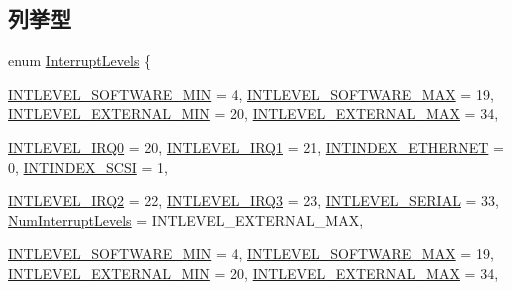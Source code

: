 \subsection*{列挙型}
\begin{DoxyCompactItemize}
\item 
enum \hyperlink{namespaceMipsISA_aa201d1f9b8ac67b80bdf6c08f370558c}{InterruptLevels} \{ \par
\hyperlink{namespaceMipsISA_aa201d1f9b8ac67b80bdf6c08f370558ca8db7857d98d7e42b3e02bed7c3c540ba}{INTLEVEL\_\-SOFTWARE\_\-MIN} =  4, 
\hyperlink{namespaceMipsISA_aa201d1f9b8ac67b80bdf6c08f370558ca9918551eda4baa1f4e11aaf334bb894b}{INTLEVEL\_\-SOFTWARE\_\-MAX} =  19, 
\hyperlink{namespaceMipsISA_aa201d1f9b8ac67b80bdf6c08f370558cafc78264c66a1ac704f17daa5fa9f9260}{INTLEVEL\_\-EXTERNAL\_\-MIN} =  20, 
\hyperlink{namespaceMipsISA_aa201d1f9b8ac67b80bdf6c08f370558cae599256ab529cbe8194cbdde120144f5}{INTLEVEL\_\-EXTERNAL\_\-MAX} =  34, 
\par
\hyperlink{namespaceMipsISA_aa201d1f9b8ac67b80bdf6c08f370558cadce4ff34f9aaeca71ba8d90672214bec}{INTLEVEL\_\-IRQ0} =  20, 
\hyperlink{namespaceMipsISA_aa201d1f9b8ac67b80bdf6c08f370558cad864f4251825107a9b1858c1fbc868c5}{INTLEVEL\_\-IRQ1} =  21, 
\hyperlink{namespaceMipsISA_aa201d1f9b8ac67b80bdf6c08f370558ca0fed6fcec83dc8d0bd48f50010ad9d0d}{INTINDEX\_\-ETHERNET} =  0, 
\hyperlink{namespaceMipsISA_aa201d1f9b8ac67b80bdf6c08f370558ca34f32f6cdf764c379b096e418b18f9c3}{INTINDEX\_\-SCSI} =  1, 
\par
\hyperlink{namespaceMipsISA_aa201d1f9b8ac67b80bdf6c08f370558caadce35d59b8bb4154d22aa7f6ab9036e}{INTLEVEL\_\-IRQ2} =  22, 
\hyperlink{namespaceMipsISA_aa201d1f9b8ac67b80bdf6c08f370558ca01099931d96b93a7403c65cd2ff5985d}{INTLEVEL\_\-IRQ3} =  23, 
\hyperlink{namespaceMipsISA_aa201d1f9b8ac67b80bdf6c08f370558ca6443c5917158463950c92bf8ec28a6eb}{INTLEVEL\_\-SERIAL} =  33, 
\hyperlink{namespaceMipsISA_aa201d1f9b8ac67b80bdf6c08f370558ca1b6c9928bdb9383e27bba1338b3f7e02}{NumInterruptLevels} =  INTLEVEL\_\-EXTERNAL\_\-MAX, 
\par
\hyperlink{namespaceMipsISA_aa201d1f9b8ac67b80bdf6c08f370558ca8db7857d98d7e42b3e02bed7c3c540ba}{INTLEVEL\_\-SOFTWARE\_\-MIN} =  4, 
\hyperlink{namespaceMipsISA_aa201d1f9b8ac67b80bdf6c08f370558ca9918551eda4baa1f4e11aaf334bb894b}{INTLEVEL\_\-SOFTWARE\_\-MAX} =  19, 
\hyperlink{namespaceMipsISA_aa201d1f9b8ac67b80bdf6c08f370558cafc78264c66a1ac704f17daa5fa9f9260}{INTLEVEL\_\-EXTERNAL\_\-MIN} =  20, 
\hyperlink{namespaceMipsISA_aa201d1f9b8ac67b80bdf6c08f370558cae599256ab529cbe8194cbdde120144f5}{INTLEVEL\_\-EXTERNAL\_\-MAX} =  34, 

\end{DoxyCompactItemize}
